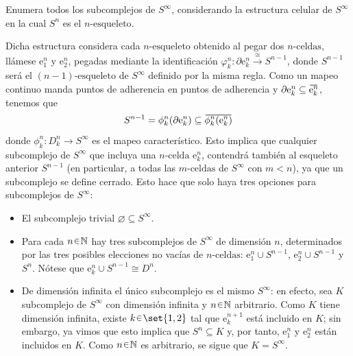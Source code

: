 \setcounter{eje}{14}
\begin{ejer}
Enumera todos los subcomplejos de $S^{\infty}$, considerando la estructura celular de $S^{\infty}$ en la cual $S^n$ es el $n\text{-esqueleto}$.
\end{ejer}
\begin{sol}
Dicha estructura considera cada $n\text{-esqueleto}$ obtenido al pegar dos $n\text{-celdas}$, llámese $\mathrm{e}^n_{1}$ y $\mathrm{e}^n_2$, pegadas mediante la identificación $\varphi^n_k \colon \partial \mathrm{e}^n_k \xrightarrow{\cong} S^{n-1}$, donde $S^{n-1}$ será el $(n-1)\text{-esqueleto}$ de $S^\infty$ definido por la misma regla. Como un mapeo continuo manda puntos de adherencia en puntos de adherencia y $\partial\mathrm{e}^n_k \subseteq \ubar{\mathrm{e}^n_k}$, tenemos que 
\[
S^{n-1} = \phi^n_k(\partial\mathrm{e}^n_k) \subseteq \ubar{\phi^n_k(\mathrm{e}^n_k)}
\]
donde $\phi^n_k \colon D^n_k \to S^\infty$ es el mapeo característico. Esto implica que cualquier subcomplejo de $S^\infty$ que incluya una $n\text{-celda}$ $\mathrm{e}^n_k$, contendrá también al esqueleto anterior $S^{n-1}$ (en particular, a todas las $m\text{-celdas}$ de $S^\infty$ con $m<n$), ya que un subcomplejo se define cerrado. Esto hace que solo haya tres opciones para subcomplejos de $S^\infty$:
\begin{itemize}
\item El subcomplejo trivial $\varnothing \subseteq S^\infty$.
\item Para cada $n \en \mathbb{N}$ hay tres subcomplejos de $S^\infty$ de dimensión $n$, determinados por las tres posibles elecciones no vacías de $n\text{-celdas}$: $\mathrm{e}^n_1 \cup S^{n-1}$, $\mathrm{e}^n_2 \cup S^{n-1}$ y $S^n$. Nótese que $\mathrm{e}^n_k \cup S^{n-1} \cong D^n$.
\item De dimensión infinita el único subcomplejo es el mismo $S^\infty$: en efecto, sea $K$ subcomplejo de $S^\infty$ con dimensión infinita y $n \en \mathbb{N}$ arbitrario. Como $K$ tiene dimensión infinita, existe $k \en \set{1,2}$ tal que $\mathrm{e}^{n+1}_k$ está incluido en $K$; sin embargo, ya vimos que esto implica que $S^n \subseteq K$ y, por tanto, $\mathrm{e}^n_1$ y $\mathrm{e}^n_2$ están incluidos en $K$. Como $n \en \mathbb{N}$ es arbitrario, se sigue que $K = S^\infty$.
\end{itemize}
\end{sol}

